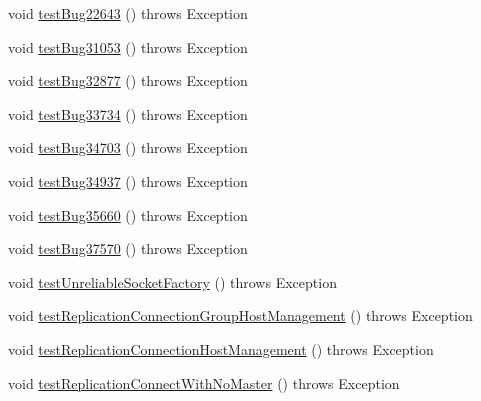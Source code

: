 \begin{DoxyCompactItemize}
\item 
void \mbox{\hyperlink{classtestsuite_1_1regression_1_1_connection_regression_test_aa286edfd17b719033e82cd5b359f2e4f}{test\+Bug22643}} ()  throws Exception 
\item 
void \mbox{\hyperlink{classtestsuite_1_1regression_1_1_connection_regression_test_acf494665c109b5683c2c91f5c5e65b5a}{test\+Bug31053}} ()  throws Exception 
\item 
void \mbox{\hyperlink{classtestsuite_1_1regression_1_1_connection_regression_test_a3e6e2512ed4fda21a7f3f97e77055134}{test\+Bug32877}} ()  throws Exception 
\item 
void \mbox{\hyperlink{classtestsuite_1_1regression_1_1_connection_regression_test_a06827fd6f7095ca49c066279b2dd41a6}{test\+Bug33734}} ()  throws Exception 
\item 
void \mbox{\hyperlink{classtestsuite_1_1regression_1_1_connection_regression_test_ab8a5be5d0f3c870006614f5aa94dd750}{test\+Bug34703}} ()  throws Exception 
\item 
void \mbox{\hyperlink{classtestsuite_1_1regression_1_1_connection_regression_test_a9db30b6a8805c65b9a39df8a682d12af}{test\+Bug34937}} ()  throws Exception 
\item 
void \mbox{\hyperlink{classtestsuite_1_1regression_1_1_connection_regression_test_ab72404e11448db0f3fe1d4ecf3d5efe1}{test\+Bug35660}} ()  throws Exception 
\item 
void \mbox{\hyperlink{classtestsuite_1_1regression_1_1_connection_regression_test_a9653d548cb8e38d99db03d4ba45bd6d1}{test\+Bug37570}} ()  throws Exception 
\item 
void \mbox{\hyperlink{classtestsuite_1_1regression_1_1_connection_regression_test_a9ae9c2a186287e35612bead467e99e2b}{test\+Unreliable\+Socket\+Factory}} ()  throws Exception 
\item 
void \mbox{\hyperlink{classtestsuite_1_1regression_1_1_connection_regression_test_adb5c91779967ec15744bc0c2a0e7a4b3}{test\+Replication\+Connection\+Group\+Host\+Management}} ()  throws Exception 
\item 
void \mbox{\hyperlink{classtestsuite_1_1regression_1_1_connection_regression_test_a64b62c680c7b892ade91490c52d9521a}{test\+Replication\+Connection\+Host\+Management}} ()  throws Exception 
\item 
void \mbox{\hyperlink{classtestsuite_1_1regression_1_1_connection_regression_test_a4bf997734efb9ae3792b63abaa6a275d}{test\+Replication\+Connect\+With\+No\+Master}} ()  throws Exception 
\item 

\end{DoxyCompactItemize}
